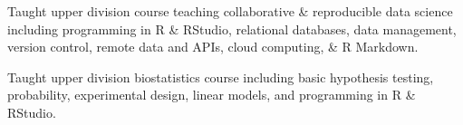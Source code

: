 \documentclass[]{deedy-resume-openfont}
\begin{document}
\begin{minipage}[t]{0.66\textwidth}
 
 Taught upper division course teaching collaborative \& reproducible data science including programming in R \& RStudio, relational databases, data management, version control, remote data and APIs, cloud computing, \& R Markdown. \href{https://espm-288.carlboettiger.info/}{\faGlobe} \href{https://github.com/ds421}{\faGithub}
\vspace{4pt}

	 
Taught upper division biostatistics course including basic hypothesis testing, probability, experimental design, linear models, and programming in R \& RStudio.
\end{minipage} 
\end{document}
